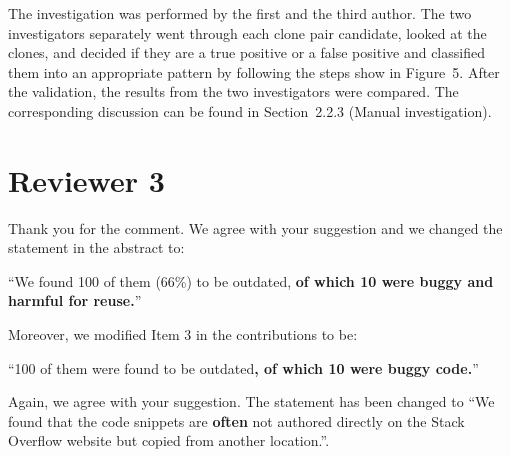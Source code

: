 \documentclass[a4paper,twoside,10pt]{reviewresponse}
\begin{document}
The investigation was performed by the first and
the third author. The two investigators separately went through each clone pair
candidate, looked at the clones, and decided if they are a true positive or a
false positive and classified them into an appropriate pattern by following the steps show in Figure~5. 
After the validation, the results from the two investigators were compared. 
The corresponding discussion can be found in Section~2.2.3 (Manual investigation).

\section{Reviewer 3}


Thank you for the comment. We agree with your suggestion and we changed the statement in the abstract to:

``We found 100 of them (66\%) to be outdated,  \textbf{of which 10 were buggy and harmful for reuse.}''

Moreover, we modified Item 3 in the contributions to be:

``100 of them were found to be outdated\textbf{, of which 10 were buggy code.}''


Again, we agree with your suggestion. The statement has been changed to ``We found that the code snippets are \textbf{often} not authored directly on the Stack Overflow website but copied from another location.''.
\end{document}
